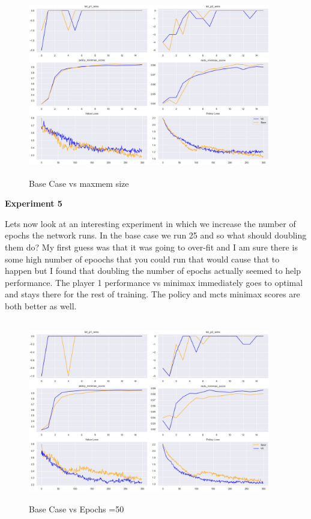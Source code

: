 \begin{figure}[H]
       \centering
       \includegraphics[width=400px,height=300px]{experiments/base_vs_maxmem.png}
       \caption{Base Case vs maxmem size}
       \label{fig:my_label}
\end{figure}


\textbf{Experiment 5}

Lets now look at an interesting experiment in which we increase the number of epochs the network runs. In the base case we run 25 and so what should doubling them do? My first guess was that it was going to over-fit and I am sure there is some high number of epoochs that you could run that would cause that to happen but I found that doubling the number of epochs actually seemed to help performance. The player 1 performance vs minimax immediately goes to optimal and stays there for the rest of training. The policy and mcts minimax scores are both better as well. 

\begin{figure}[H]
       \centering
       \includegraphics[width=400px,height=300px]{experiments/base_vs_epochs=50.png}
       \caption{Base Case vs Epochs =50}
       \label{fig:my_label}
\end{figure}


